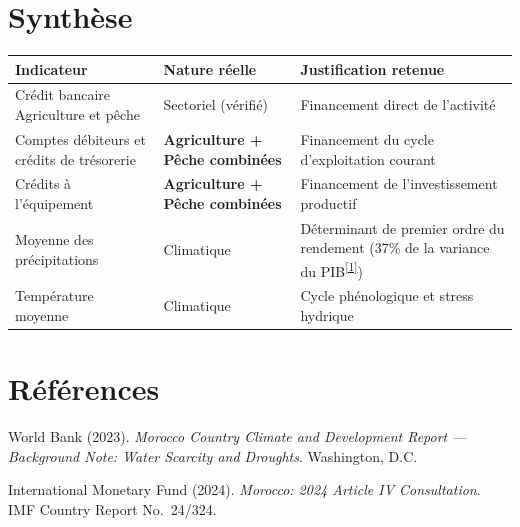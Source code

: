 \documentclass[11pt,a4paper]{article}
\newcommand{\cit}[1]{\textsuperscript{\hyperlink{ref#1}{[#1]}}}
\begin{document}
\section{Synthèse}

\begin{fichebox}
\begin{center}
\small
\begin{tabular}{p{4.3cm}p{2.2cm}p{7.3cm}}
\toprule
\textbf{Indicateur} & \textbf{Nature réelle} & \textbf{Justification retenue} \\
\midrule
Crédit bancaire Agriculture et pêche & Sectoriel (vérifié) & Financement direct de l'activité \\
Comptes débiteurs et crédits de trésorerie & \textbf{Agriculture + Pêche combinées} & Financement du cycle d'exploitation courant \\
Crédits à l'équipement & \textbf{Agriculture + Pêche combinées} & Financement de l'investissement productif \\
Moyenne des précipitations & Climatique & Déterminant de premier ordre du rendement (37\% de la variance du PIB\cit{1}) \\
Température moyenne & Climatique & Cycle phénologique et stress hydrique \\
\bottomrule
\end{tabular}
\end{center}
\end{fichebox}

\section*{Références}
\begin{enumerate}[leftmargin=1.6em, label=\textbf{[\arabic*]}]
\item \hypertarget{ref1}{} World Bank (2023). \textit{Morocco Country Climate and Development Report --- Background Note: Water Scarcity and Droughts}. Washington, D.C.
\item \hypertarget{ref2}{} International Monetary Fund (2024). \textit{Morocco: 2024 Article IV Consultation}. IMF Country Report No.\ 24/324.
\end{enumerate}
\end{document}
